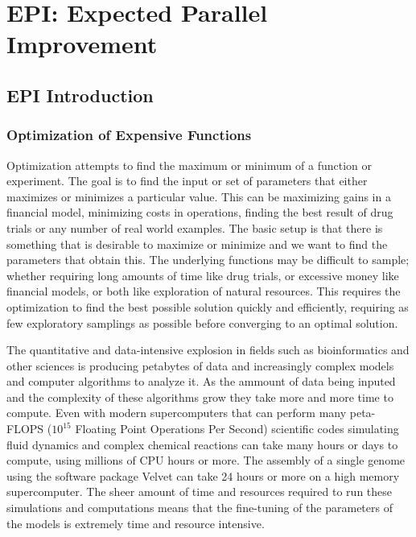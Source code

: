 \documentclass[phd,tocprelim]{cornell}
\begin{document}


\part{EPI: Expected Parallel Improvement} %
\label{prt:EPI: Expected Parallel Improvement}

\chapter{EPI Introduction} %
\label{cha:EPI Introduction}

\section{Optimization of Expensive Functions}

Optimization attempts to find the maximum or minimum of a function or experiment. The goal is to find the input or set of parameters that either maximizes or minimizes a particular value. This can be maximizing gains in a financial model, minimizing costs in operations, finding the best result of drug trials or any number of real world examples. The basic setup is that there is something that is desirable to maximize or minimize and we want to find the parameters that obtain this. The underlying functions may be difficult to sample; whether requiring long amounts of time like drug trials, or excessive money like financial models, or both like exploration of natural resources. This requires the optimization to find the best possible solution quickly and efficiently, requiring as few exploratory samplings as possible before converging to an optimal solution.

The quantitative and data-intensive explosion in fields such as bioinformatics and other sciences is producing petabytes of data and increasingly complex models and computer algorithms to analyze it. As the ammount of data being inputed and the complexity of these algorithms grow they take more and more time to compute. Even with modern supercomputers that can perform many peta-FLOPS ($10^{15}$ Floating Point Operations Per Second) \cite{Hopper} scientific codes simulating fluid dynamics \cite{Compo2011} and complex chemical reactions \cite{Valiev2010} can take many hours or days to compute, using millions of CPU hours or more. The assembly of a single genome using the software package Velvet \cite{Zerbino2008} can take 24 hours or more on a high memory supercomputer. The sheer amount of time and resources required to run these simulations and computations means that the fine-tuning of the parameters of the models is extremely time and resource intensive.
\end{document}
